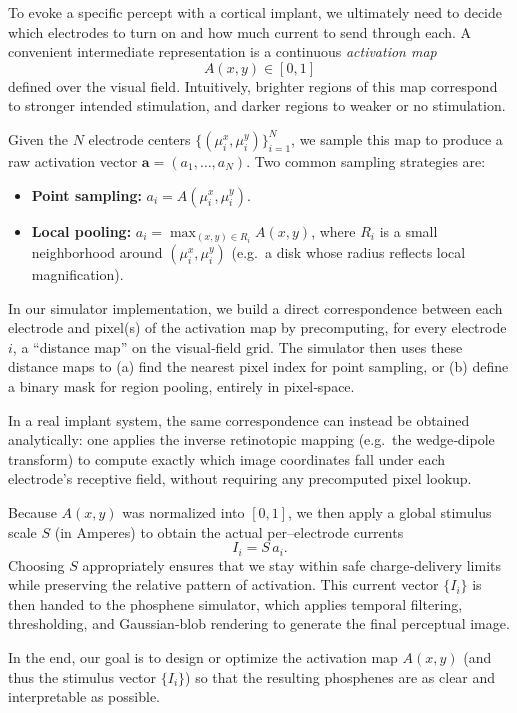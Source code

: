 To evoke a specific percept with a cortical implant, we ultimately need to decide which electrodes to turn on and how much current to send through each.  A convenient intermediate representation is a continuous \emph{activation map} 
\[
  A(x,y)\in[0,1]
\]
defined over the visual field.  Intuitively, brighter regions of this map correspond to stronger intended stimulation, and darker regions to weaker or no stimulation.  

Given the $N$ electrode centers \(\{(\mu_i^x,\mu_i^y)\}_{i=1}^N\), we sample this map to produce a raw activation vector \(\mathbf{a}=(a_1,\dots,a_N)\).  Two common sampling strategies are:

\begin{itemize}
  \item \textbf{Point sampling:}  
    \(\displaystyle a_i = A(\mu_i^x,\mu_i^y)\).
  \item \textbf{Local pooling:}  
    \(\displaystyle a_i = \max_{(x,y)\in R_i} A(x,y)\), where \(R_i\) is a small neighborhood around \((\mu_i^x,\mu_i^y)\) (e.g.\ a disk whose radius reflects local magnification).
\end{itemize}

In our simulator implementation, we build a direct correspondence between each electrode and pixel(s) of the activation map by precomputing, for every electrode \(i\), a “distance map” on the visual‐field grid.  The simulator then uses these distance maps to (a) find the nearest pixel index for point sampling, or (b) define a binary mask for region pooling, entirely in pixel‐space.  

In a real implant system, the same correspondence can instead be obtained analytically: one applies the inverse retinotopic mapping (e.g.\ the wedge‐dipole transform) to compute exactly which image coordinates fall under each electrode’s receptive field, without requiring any precomputed pixel lookup.

Because \(A(x,y)\) was normalized into \([0,1]\), we then apply a global stimulus scale \(S\) (in Amperes) to obtain the actual per–electrode currents
\[
  I_i = S\,a_i.
\]
Choosing \(S\) appropriately ensures that we stay within safe charge‐delivery limits while preserving the relative pattern of activation.  This current vector \(\{I_i\}\) is then handed to the phosphene simulator, which applies temporal filtering, thresholding, and Gaussian‐blob rendering to generate the final perceptual image.  

In the end, our goal is to design or optimize the activation map \(A(x,y)\) (and thus the stimulus vector \(\{I_i\}\)) so that the resulting phosphenes are as clear and interpretable as possible.




